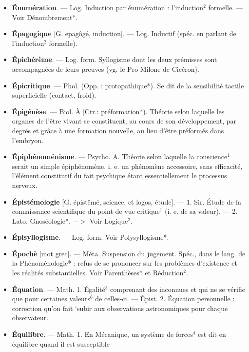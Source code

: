 \begin{itemize}[leftmargin=1cm, label=, itemsep=1pt]
\item {\bf Énumération}. — Log. Induction par
énumération : l'induction$^2$ formelle.
— Voir Dénombrement*.

\item {\bf Épagogique} [G. epagôgé, induction].
— Log. Inductif (spéc. en parlant
de l’induction$^2$ formelle).

\item {\bf Épichérème}. — Log. form. Syllogisme dont les deux prémisses sont
accompagnées de leurs preuves (vg.
le Pro Milone de Cicéron).

\item {\bf Épicritique}. — Phol. (Opp. : protopathique*). Se dit de la sensibilité tactile superficielle (contact, froid).

\item {\bf Épigénèse}. — Biol. À [Ctr.: préformation*). Théorie selon laquelle les
organes de l'être vivant se constituent, au cours de son développement, par degrés et grâce à une
formation nouvelle, au lieu d'être
préformés dans l'embryon.

\item {\bf Épiphénoménisme}. — Psycho. A.
Théorie selon laquelle la conscience$^1$
serait un simple épiphénomène, i. e.
un phénomène accessoire, sans efficacité, l’élément constitutif du fait
psychique étant essentiellement le
processus nerveux.

\item {\bf Épistémologie} [G. épistêmé, science,
et logos, étude]. — 1. Sir. Étude de
la connaissance scientifique du point
de vue critique$^1$ (i. e. de sa valeur).
— 2. Lato. Gnoséologie*. $->$ Voir
Logique$^2$.

\item {\bf Épisyllogisme}. — Log. form. Voir
Polysyllogisme*.

\item {\bf Épochè} [mot grec]. — Méta. Suspension du jugement. Spéc., dans le
lang. de la Phénoménologie* : refus
de se prononcer sur les problèmes
d'existence et les réalités substantielles. Voir Parenthèses* et Réduction$^2$.

\item {\bf Équation}. — Math. 1. Égalité$^3$ comprenant des inconnues et qui ne se
vérifie que pour certaines valeurs$^6$
de celles-ci. — Épist. 2. Équation
personnelle : correction qu'on fait
‘subir aux observations astronomiques pour chaque observateur.

\item {\bf Équilibre}. — Math. 1. En Mécanique,
un système de forces$^4$ est dit en
équilibre quand il est susceptible


\end{itemize}
